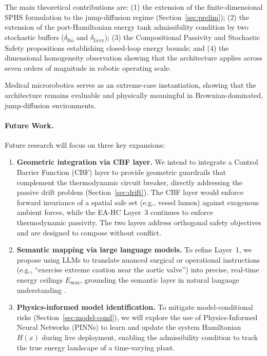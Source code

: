 \documentclass[11pt]{article}
\begin{document}
The main theoretical contributions are: (1) the extension of the finite-dimensional SPHS
formulation to the jump-diffusion regime (Section~\ref{sec:prelim}); (2) the extension of the
port-Hamiltonian energy tank admissibility condition by two stochastic buffers
($\delta_{\mathrm{It\hat{o}}}$ and $\delta_{\mathrm{L\acute{e}vy}}$); (3) the Compositional
Passivity and Stochastic Safety propositions establishing closed-loop energy bounds; and (4)
the dimensional homogeneity observation showing that the architecture applies across seven
orders of magnitude in robotic operating scale.

Medical microrobotics serves as an extreme-case instantiation, showing that the architecture
remains evaluable and physically meaningful in Brownian-dominated, jump-diffusion environments.

\paragraph{Future Work.} Future research will focus on three key expansions:
\begin{enumerate}
\item \textbf{Geometric integration via CBF layer.} We intend to integrate a Control Barrier
  Function (CBF) layer \cite{ames2017} to provide geometric guardrails that complement the
  thermodynamic circuit breaker, directly addressing the passive drift problem
  (Section~\ref{sec:drift}). The CBF layer would enforce forward invariance of a spatial safe
  set (e.g., vessel lumen) against exogenous ambient forces, while the EA-HC Layer~3
  continues to enforce thermodynamic passivity. The two layers address orthogonal safety
  objectives and are designed to compose without conflict.

\item \textbf{Semantic mapping via large language models.} To refine Layer~1, we propose
  using LLMs to translate nuanced surgical or operational instructions (e.g., ``exercise
  extreme caution near the aortic valve'') into precise, real-time energy ceilings $E_{\max}$,
  grounding the semantic layer in natural language understanding \cite{ahn2023}.

\item \textbf{Physics-informed model identification.} To mitigate model-conditional risks
  (Section~\ref{sec:model-cond}), we will explore the use of Physics-Informed Neural Networks
  (PINNs) \cite{raissi2019} to learn and update the system Hamiltonian $H(x)$ during live
  deployment, enabling the admissibility condition to track the true energy landscape of a
  time-varying plant.
\end{enumerate}
\end{document}
